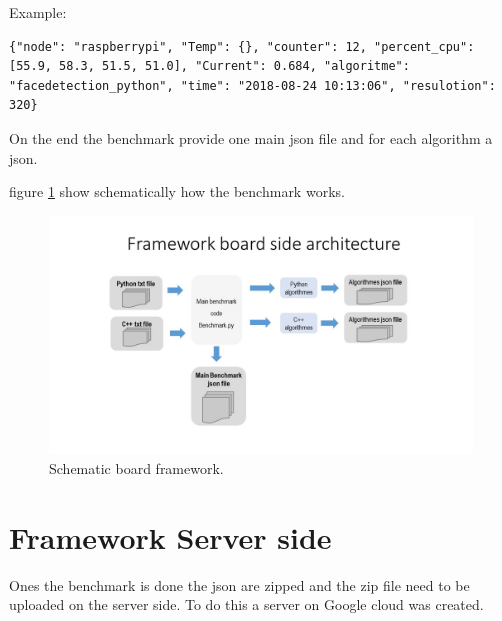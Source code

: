 \documentclass[english]{book_template} %
\begin{document}
Example:

\begin{lstlisting}
{"node": "raspberrypi", "Temp": {}, "counter": 12, "percent_cpu": [55.9, 58.3, 51.5, 51.0], "Current": 0.684, "algoritme": "facedetection_python", "time": "2018-08-24 10:13:06", "resulotion": 320}
	\end{lstlisting}

On the end the benchmark provide one main json file and for each algorithm a json. 

figure \ref{fig:board Arch} show schematically how the benchmark works.

\begin{figure}[H]
\center
\caption{Schematic board framework.\label{fig:board Arch}}
\includegraphics[scale=0.55]{./img/boardArch.jpg}
\end{figure} 

\section{Framework Server side}

Ones the benchmark is done the json are zipped and the zip file need to be uploaded on the server side. To do this a server on Google cloud was created. 
\end{document}
